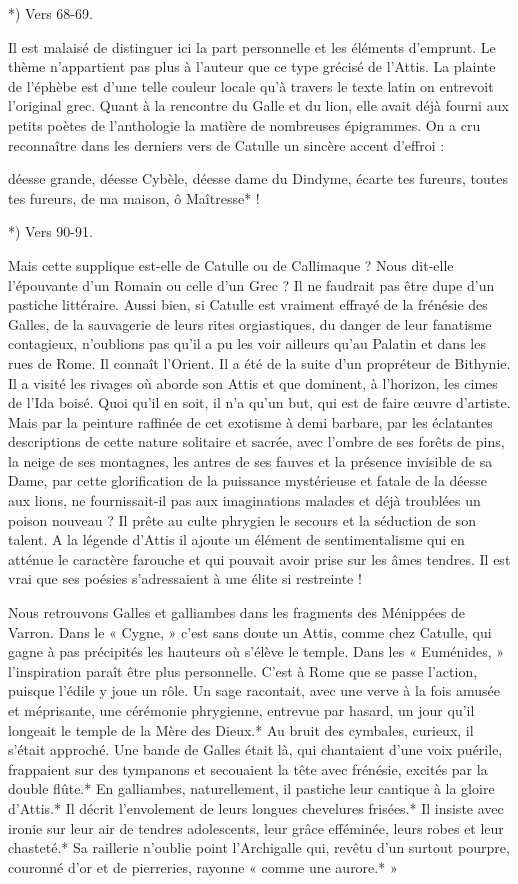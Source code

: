 \documentclass[a4paper, 11pt, oneside, polutonikogreek, french]{article}
\begin{document}
*) Vers 68-69.

Il est malaisé de distinguer ici la part personnelle et les éléments d'emprunt. Le thème n'appartient pas plus à l'auteur que ce type grécisé de l'Attis. La plainte de l'éphèbe est d'une telle couleur locale qu'à travers le texte latin on entrevoit l'original grec. Quant à la rencontre du Galle et du lion, elle avait déjà fourni aux petits poètes de l'anthologie la matière de nombreuses épigrammes. On a cru reconnaître dans les derniers vers de Catulle un sincère accent d'effroi :

déesse grande, déesse Cybèle, déesse dame du Dindyme,  
écarte tes fureurs, toutes tes fureurs, de ma maison, ô Maîtresse* !

*) Vers 90-91.

Mais cette supplique est-elle de Catulle ou de Callimaque ? Nous dit-elle l'épouvante d'un Romain ou celle d'un Grec ? Il ne faudrait pas être dupe d'un pastiche littéraire. Aussi bien, si Catulle est vraiment effrayé de la frénésie des Galles, de la sauvagerie de leurs rites orgiastiques, du danger de leur fanatisme contagieux, n'oublions pas qu'il a pu les voir ailleurs qu'au Palatin et dans les rues de Rome. Il connaît l'Orient. Il a été de la suite d'un propréteur de Bithynie. Il a visité les rivages où aborde son Attis et que dominent, à l'horizon, les cimes de l'Ida boisé. Quoi qu'il en soit, il n'a qu'un but, qui est de faire œuvre d'artiste. Mais par la peinture raffinée de cet exotisme à demi barbare, par les éclatantes descriptions de cette nature solitaire et sacrée, avec l'ombre de ses forêts de pins, la neige de ses montagnes, les antres de ses fauves et la présence invisible de sa Dame, par cette glorification de la puissance mystérieuse et fatale de la déesse aux lions, ne fournissait-il pas aux imaginations malades et déjà troublées un poison nouveau ? Il prête au culte phrygien le secours et la séduction de son talent. A la légende d'Attis il ajoute un élément de sentimentalisme qui en atténue le caractère farouche et qui pouvait avoir prise sur les âmes tendres. Il est vrai que ses poésies s'adressaient à une élite si restreinte !

Nous retrouvons Galles et galliambes dans les fragments des Ménippées de Varron. Dans le « Cygne, » c'est sans doute un Attis, comme chez Catulle, qui gagne à pas précipités les hauteurs où s'élève le temple. Dans les « Euménides, » l'inspiration paraît être plus personnelle. C'est à Rome que se passe l'action, puisque l'édile y joue un rôle. Un sage racontait, avec une verve à la fois amusée et méprisante, une cérémonie phrygienne, entrevue par hasard, un jour qu'il longeait le temple de la Mère des Dieux.* Au bruit des cymbales, curieux, il s'était approché. Une bande de Galles était là, qui chantaient d'une voix puérile, frappaient sur des tympanons et secouaient la tête avec frénésie, excités par la double flûte.* En galliambes, naturellement, il pastiche leur cantique à la gloire d'Attis.* Il décrit l'envolement de leurs longues chevelures frisées.* Il insiste avec ironie sur leur air de tendres adolescents, leur grâce efféminée, leurs robes et leur chasteté.* Sa raillerie n'oublie point l'Archigalle qui, revêtu d'un surtout pourpre, couronné d'or et de pierreries, rayonne « comme une aurore.* »
\end{document}

